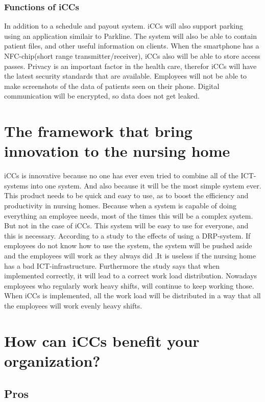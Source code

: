 \documentclass{report}
\begin{document}
\subsection{Functions of iCCs}

In addition to a schedule and payout system. iCCs will also support parking using an application similair to Parkline. The system will also be able to contain patient files, and other useful information on clients. When the smartphone has a NFC-chip(short range transmitter/receiver), iCCs also will be able to store access passes.
Privacy is an important factor in the health care, therefor iCCs will have the latest security standards that are available. Employees will not be able to make screenshots of the data of patients seen on their phone. Digital communication will be encrypted, so data does not get leaked. 

\chapter{The framework that bring innovation to the nursing home}
\thispagestyle{fancy}

iCCs is innovative because no one has ever even tried to combine all of the ICT-systems into one system. And also because it will be the most simple system ever. This product needs to be quick and easy to use, as to boost the efficiency and productivity in nursing homes. Because when a system is capable of doing everything an employee needs, most of the times this will be a complex system. But not in the case of iCCs. This system will be easy to use for everyone, and this is necessary. According to a study to the effects of using a DRP-system. If employees do not know how to use the system, the system will be pushed aside and the employees will work as they always did \cite{Michels2009}.It is useless if the nursing home has a bad ICT-infrastructure. Furthermore the study says that when implemented correctly, it will lead to a correct work load distribution. Nowadays employees who regularly work heavy shifts, will continue to keep working those. When iCCs is implemented, all the work load will be distributed in a way that all the employees will work evenly heavy shifts.
  
\chapter{How can iCCs benefit your organization?}
\thispagestyle{fancy}
\section{Pros}
\end{document}
